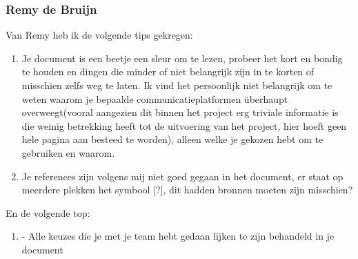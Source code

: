 \documentclass[a4paper]{report}
\begin{document}
\subsubsection{Remy de Bruijn}
Van Remy heb ik de volgende tips gekregen:
\begin{enumerate}
  \item Je document is een beetje een sleur om te lezen, probeer het kort en bondig te houden en dingen die minder of niet belangrijk zijn in te korten of misschien zelfs weg te laten. Ik vind het persoonlijk niet belangrijk om te weten waarom je bepaalde communicatieplatformen überhaupt overweegt(vooral aangezien dit binnen het project erg triviale informatie is die weinig betrekking heeft tot de uitvoering van het project, hier hoeft geen hele pagina aan besteed te worden), alleen welke je gekozen hebt om te gebruiken en waarom. 
  \item Je references zijn volgens mij niet goed gegaan in het document, er staat op meerdere plekken het symbool [?], dit hadden bronnen moeten zijn misschien?
\end{enumerate}

En de volgende top:
\begin{enumerate}
  \item - Alle keuzes die je met je team hebt gedaan lijken te zijn behandeld in je document
\end{enumerate}
\end{document}
